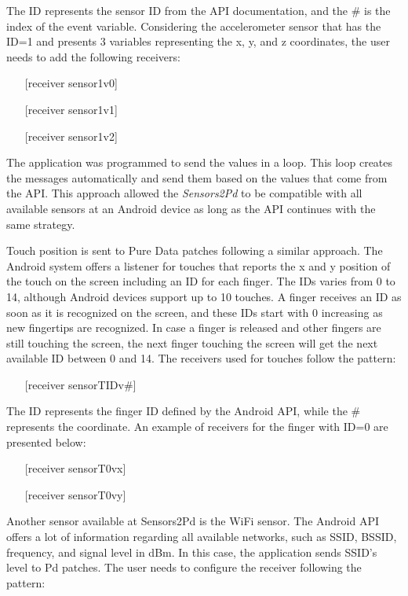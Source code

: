The ID represents the sensor ID from the API documentation, and the \# is the index of the event variable.
Considering the accelerometer sensor that has the ID=1 and presents 3 variables representing the x, y, and z coordinates, the user needs to add the following receivers:

\begin{itemize}\itemsep0em
	\item[]    [receiver sensor1v0]
	\item[]    [receiver sensor1v1]
	\item[]    [receiver sensor1v2]
\end{itemize}

The application was programmed to send the values in a loop.
This loop creates the messages automatically and send them based on the values that come from the API.
This approach allowed the \textit{Sensors2Pd} to be compatible with all available sensors at an Android device as long as the API continues with the same strategy.

Touch position is sent to Pure Data patches following a similar approach.
The Android system offers a listener for touches that reports the x and y position of the touch on the screen including an ID for each finger.
The IDs varies from 0 to 14, although Android devices support up to 10 touches.
A finger receives an ID as soon as it is recognized on the screen, and these IDs start with 0 increasing as new fingertips are recognized.
In case a finger is released and other fingers are still touching the screen, the next finger touching the screen will get the next available ID between 0 and 14.
The receivers used for touches follow the pattern:

\begin{itemize}\itemsep0em
	\item[]  [receiver sensorT{ID}v{\#}]
\end{itemize}

The ID represents the finger ID defined by the Android API, while the \# represents the coordinate.
An example of receivers for the finger with ID=0 are presented below:

\begin{itemize}\itemsep0em
	\item[]   [receiver sensorT0vx]
	\item[]   [receiver sensorT0vy]
\end{itemize}

Another sensor available at Sensors2Pd is the WiFi sensor.
The Android API offers a lot of information regarding all available networks, such as SSID, BSSID, frequency, and signal level in dBm.
In this case, the application sends SSID's level to Pd patches.
The user needs to configure the receiver following the pattern:

